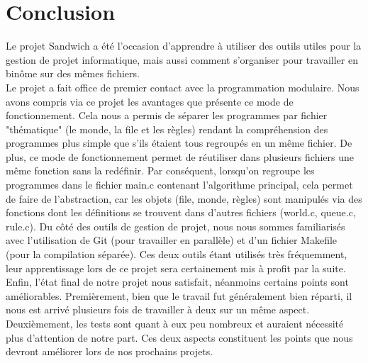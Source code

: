 \documentclass[a4paper]{article}
\begin{document}
\section*{Conclusion}
Le projet Sandwich a été l'occasion d'apprendre à utiliser des outils utiles pour la gestion de projet informatique, mais aussi comment s'organiser pour travailler en binôme sur des mêmes fichiers.\\
\indent Le projet a fait office de premier contact avec la programmation modulaire. Nous avons compris via ce projet les avantages que présente ce mode de fonctionnement. Cela nous a permis de séparer les programmes par fichier "thématique" (le monde, la file et les règles) rendant la compréhension des programmes plus simple que s'ils étaient tous regroupés en un même fichier. De plus, ce mode de fonctionnement permet de réutiliser dans plusieurs fichiers une même fonction sans la redéfinir. Par conséquent, lorsqu'on regroupe les programmes dans le fichier main.c contenant l'algorithme principal, cela permet de faire de l'abstraction, car les objets (file, monde, règles) sont manipulés via des fonctions dont les définitions se trouvent dans d'autres fichiers (world.c, queue.c, rule.c).
Du côté des outils de gestion de projet, nous nous sommes familiarisés avec l'utilisation de Git (pour travailler en parallèle) et d'un fichier Makefile (pour la compilation séparée). Ces deux outils étant utilisés très fréquemment, leur apprentissage lors de ce projet sera certainement mis à profit par la suite.\\
\indent Enfin, l'état final de notre projet nous satisfait, néanmoins certains points sont améliorables. Premièrement, bien que le travail fut généralement bien réparti, il nous est arrivé plusieurs fois de travailler à deux sur un même aspect. Deuxièmement, les tests sont quant à eux peu nombreux et auraient nécessité plus d'attention de notre part. Ces deux aspects constituent les points que nous devront améliorer lors de nos prochains projets.
\end{document}
